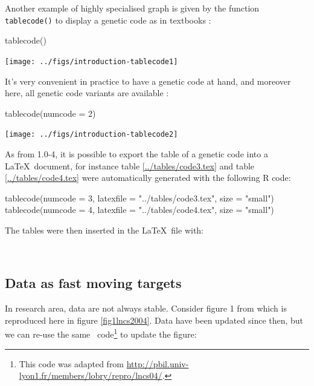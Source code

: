 \documentclass{article}
\begin{document}
Another example of highly specialised graph is given by the function \texttt{tablecode()} to
display a genetic code as in textbooks :

\begin{Schunk}
\begin{Sinput}
 tablecode()
\end{Sinput}
\end{Schunk}
\texttt{[image: ../figs/introduction-tablecode1]}

It's very convenient in practice to have a genetic code at hand, and moreover here,
all genetic code variants are available :

\begin{Schunk}
\begin{Sinput}
 tablecode(numcode = 2)
\end{Sinput}
\end{Schunk}
\texttt{[image: ../figs/introduction-tablecode2]}

As from \seqinr{} 1.0-4, it is possible to export the table of a genetic code into a \LaTeX~document,
for instance table \ref{../tables/code3.tex} and table \ref{../tables/code4.tex} were automatically generated with the following R code:

\begin{Schunk}
\begin{Sinput}
 tablecode(numcode = 3, latexfile = "../tables/code3.tex", 
     size = "small")
 tablecode(numcode = 4, latexfile = "../tables/code4.tex", 
     size = "small")
\end{Sinput}
\end{Schunk}




The tables were then inserted in the \LaTeX~file with:
\begin{verbatim}


\end{verbatim}

\subsection{Data as fast moving targets}
 
In research area, data are not always stable. 
Consider figure 1 from \cite{lobrylncs} which is reproduced here in figure \ref{fig1lncs2004}.
Data have been updated since then, but we can re-use  the same \Rlogo{}~code\footnote{
This code was adapted from \url{http://pbil.univ-lyon1.fr/members/lobry/repro/lncs04/}.
}
to update the figure:
\end{document}
